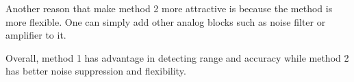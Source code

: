 Another reason that make method 2 more attractive is because the method is more flexible.
One can simply add other analog blocks such as noise filter or amplifier to it.

Overall, method 1 has advantage in detecting range and accuracy while method 2 has better noise suppression and flexibility.










%
